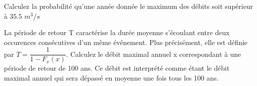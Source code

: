\begin{exo}
  	\begin{subexo}{Calculez la probabilité qu'une année donnée le maximum des débits soit supérieur à $35.5$  $m^3/s$}
  	\end{subexo}
  	\begin{subexo}{La période de retour T caractérise la durée moyenne s'écoulant entre deux occurences consécutives d'un même événement. Plus précisément, elle est définie par $ T = \dfrac{1}{1- F_x(x)}$. Calculez le débit maximal annuel x correspondant à une période de retour de 100 ans. Ce débit est interprété comme étant le débit maximal annuel qui sera dépassé en moyenne une fois tous les 100 ans.}
	\end{subexo}
\end{exo}
